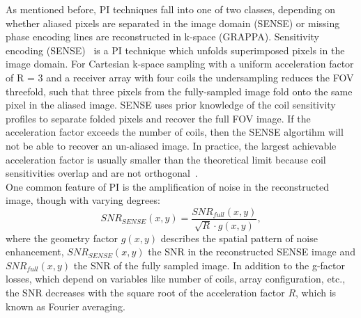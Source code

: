 As mentioned before, PI techniques fall into one of two classes, depending on whether aliased pixels are separated in the image domain (SENSE) or missing phase encoding lines are reconstructed in k-space (GRAPPA). Sensitivity encoding (SENSE)~\cite{SENSE1} is a PI technique which unfolds superimposed pixels in the image domain. For Cartesian k-space sampling with a uniform acceleration factor of R = 3 and a receiver array with four coils the undersampling reduces the FOV threefold, such that three pixels from the fully-sampled image fold onto the same pixel in the aliased image. SENSE uses prior knowledge of the coil sensitivity profiles to separate folded pixels and recover the full FOV image. 
If the acceleration factor exceeds the number of coils, then the
SENSE 
algortihm will not be able to recover an un-aliased image.
In practice, the largest achievable acceleration factor is usually smaller than the theoretical limit because coil sensitivities overlap and are not orthogonal~\cite{AdvancesPI}.\\
One common feature of PI is the amplification of noise in the reconstructed image, though with varying degrees:
\begin{equation} \label{eq:SNR-SENSE}
	SNR_{SENSE}(x,y) = \frac{SNR_{full}(x,y)}{\sqrt{R} \cdot g(x,y)},
\end{equation}
where the geometry factor $g(x,y)$ describes the spatial pattern of noise enhancement, $SNR_{SENSE}(x,y)$ the SNR in the reconstructed SENSE image and $SNR_{full}(x,y)$ the SNR of the fully sampled image. In addition to the g-factor losses, which depend on variables like number of coils, array configuration, etc., the SNR decreases with the square root of the acceleration factor $R$, which is known as Fourier averaging.\\
